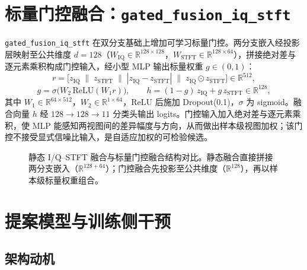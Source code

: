 \section{标量门控融合：\texttt{gated\_fusion\_iq\_stft}}

\texttt{gated\_fusion\_iq\_stft} 在双分支基础上增加可学习标量门控。两分支嵌入经投影层映射至公共维度 \(d=128\)（\(W_{\mathrm{IQ}}\in\mathbb{R}^{128\times128}\)，\(W_{\mathrm{STFT}}\in\mathbb{R}^{128\times64}\)），拼接绝对差与逐元素乘积构成门控输入，经小型 MLP 输出标量权重 \(g\in(0,1)\)：
\begin{equation}
  r=\bigl[z_{\mathrm{IQ}}\;\|\;z_{\mathrm{STFT}}\;\|\;|z_{\mathrm{IQ}}-z_{\mathrm{STFT}}|\;\|\;z_{\mathrm{IQ}}\odot z_{\mathrm{STFT}}\bigr]\in\mathbb{R}^{512},
  \label{eq:gated-input}
\end{equation}
\begin{equation}
  g=\sigma\!\bigl(W_2\,\mathrm{ReLU}(W_1 r)\bigr),\qquad
  h=(1-g)\,z_{\mathrm{IQ}}+g\,z_{\mathrm{STFT}}\in\mathbb{R}^{128},
  \label{eq:gated-fusion}
\end{equation}
其中 \(W_1\in\mathbb{R}^{64\times512}\)，\(W_2\in\mathbb{R}^{1\times64}\)，\(\mathrm{ReLU}\) 后施加 Dropout(0.1)，\(\sigma\) 为 sigmoid。融合向量 \(h\) 经 \(128\to128\to11\) 分类头输出 logits。门控输入加入绝对差与逐元素乘积，使 MLP 能感知两视图间的差异幅度与方向，从而做出样本级视图加权；该门控不接受显式信噪比输入，是自适应加权的可检验候选。

\begin{figure}[htbp]
  \centering
  
  \caption{静态 I/Q--STFT 融合与标量门控融合结构对比。静态融合直接拼接两分支嵌入（\(\mathbb{R}^{128+64}\)）；门控融合先投影至公共维度（\(\mathbb{R}^{128}\)），再以样本级标量权重组合。}
  \label{fig:fusion-architecture}
\end{figure}

\section{提案模型与训练侧干预}\label{sec:method-proposed}

\subsection{架构动机}

